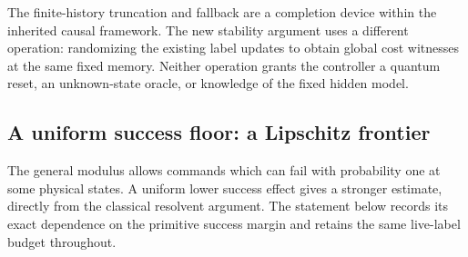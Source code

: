 The finite-history truncation and fallback are a completion device
within the inherited causal framework.  The new stability argument
uses a different operation: randomizing the existing label updates
to obtain global cost witnesses at the same fixed memory.  Neither
operation grants the controller a quantum reset, an unknown-state
oracle, or knowledge of the fixed hidden model.

\subsection{A uniform success floor: a Lipschitz frontier}

The general modulus allows commands which can fail with probability
one at some physical states.  A uniform lower success effect gives
a stronger estimate, directly from the classical resolvent argument.
The statement below records its exact dependence on the primitive
success margin and retains the same live-label budget throughout.

